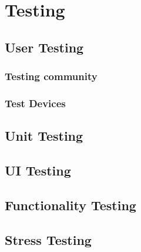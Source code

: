 \chapter{Testing}

\section{User Testing}

\subsection{Testing community}

\subsection{Test Devices}


\section{Unit Testing}

\section{UI Testing}

\section{Functionality Testing}

\section{Stress Testing}

